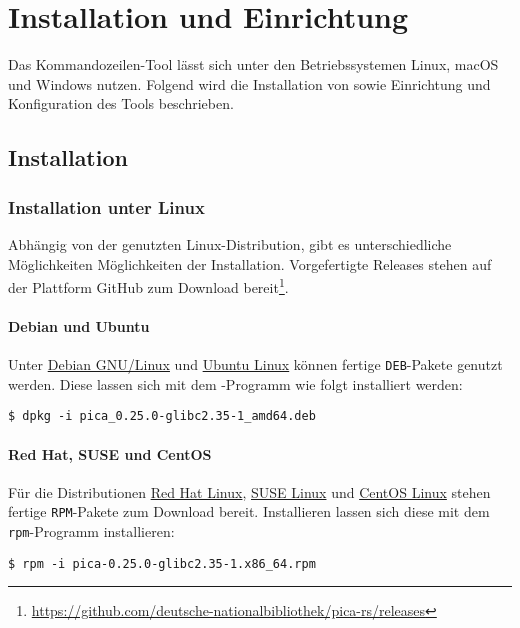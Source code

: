 \chapter{Installation und Einrichtung}

Das Kommandozeilen-Tool \pica{} lässt sich unter den Betriebssystemen
Linux, macOS und Windows nutzen. Folgend wird die Installation von
sowie Einrichtung und Konfiguration des Tools beschrieben.

\section{Installation}

\subsection{Installation unter Linux}

Abhängig von der genutzten Linux-Distribution, gibt es
unterschiedliche Möglichkeiten Möglichkeiten der
Installation. Vorgefertigte Releases stehen auf der Plattform GitHub
zum Download
bereit\footnote{\url{https://github.com/deutsche-nationalbibliothek/pica-rs/releases}}.

\subsubsection{Debian und Ubuntu}

Unter \href{https://www.debian.org}{Debian GNU/Linux} und
\href{https://ubuntu.com}{Ubuntu Linux} können fertige
\texttt{DEB}-Pakete genutzt werden.  Diese lassen sich mit dem
-Programm wie folgt installiert werden:

\begin{verbatim}
$ dpkg -i pica_0.25.0-glibc2.35-1_amd64.deb
\end{verbatim}

\subsubsection{Red Hat, SUSE und CentOS}

Für die Distributionen \href{https://www.redhat.com}{Red Hat Linux},
\href{https://www.suse.com}{SUSE Linux} und
\href{https://www.centos.org}{CentOS Linux} stehen fertige
\texttt{RPM}-Pakete zum Download bereit. Installieren lassen sich
diese mit dem \texttt{rpm}-Programm installieren:

\begin{verbatim}
$ rpm -i pica-0.25.0-glibc2.35-1.x86_64.rpm
\end{verbatim}


